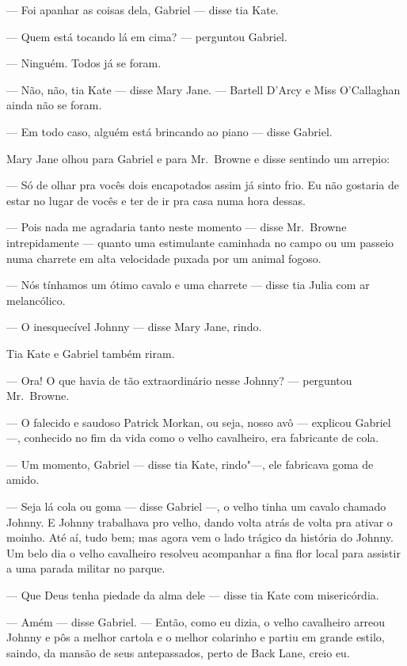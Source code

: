 --- Foi apanhar as coisas dela, Gabriel --- disse tia Kate.

--- Quem está tocando lá em cima? --- perguntou Gabriel.

--- Ninguém.  Todos já se foram.

--- Não, não, tia Kate --- disse Mary Jane.  --- Bartell D’Arcy e Miss
O’Callaghan ainda não se foram.

--- Em todo caso, alguém está brincando ao piano --- disse Gabriel.

Mary Jane olhou para Gabriel e para Mr.~Browne e disse sentindo um arrepio:

--- Só de olhar pra vocês dois encapotados assim já sinto frio.  Eu não
gostaria de estar no lugar de vocês e ter de ir pra casa numa hora dessas.

--- Pois nada me agradaria tanto neste momento --- disse Mr.~Browne
intrepidamente --- quanto uma estimulante caminhada no campo ou um passeio numa
charrete em alta velocidade puxada por um animal fogoso.

--- Nós tínhamos um ótimo cavalo e uma charrete --- disse tia Julia com ar
melancólico.

--- O inesquecível Johnny --- disse Mary Jane, rindo.

Tia Kate e Gabriel também riram.

--- Ora!  O que havia de tão extraordinário nesse Johnny? --- perguntou 
Mr.~Browne.

--- O falecido e saudoso Patrick Morkan, ou seja, nosso avô --- explicou
Gabriel ---, conhecido no fim da vida como o velho cavalheiro, era fabricante
de cola.

--- Um momento, Gabriel --- disse tia Kate, rindo"---, ele fabricava goma de
amido.

--- Seja lá cola ou goma --- disse Gabriel ---, o velho tinha um cavalo chamado
Johnny.  E Johnny trabalhava pro velho, dando volta atrás de volta pra ativar o
moinho.  Até aí, tudo bem; mas agora vem o lado trágico da história do Johnny.
Um belo dia o velho cavalheiro resolveu acompanhar a fina flor local para
assistir a uma parada militar no parque.

--- Que Deus tenha piedade da alma dele --- disse tia Kate com misericórdia.

--- Amém --- disse Gabriel.  --- Então, como eu dizia, o velho cavalheiro
arreou Johnny e pôs a melhor cartola e o melhor colarinho e partiu em grande
estilo, saindo, da mansão de seus antepassados, perto de Back Lane, creio eu.

